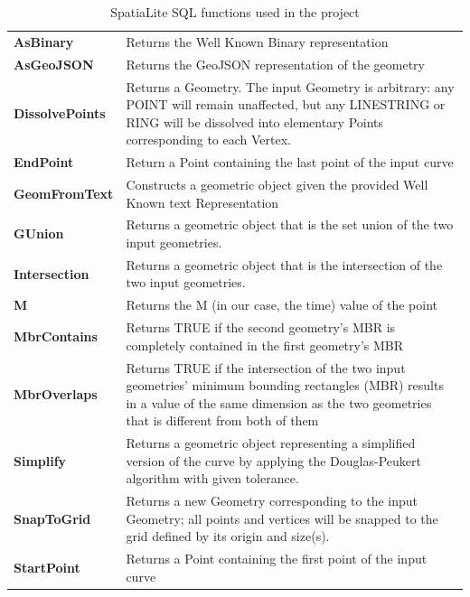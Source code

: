 \documentclass[12pt,a4paper]{article}
\begin{document}
                \begin{table}
                    \begin{tabular}{ | p{3.5cm} p{11.5cm} | }
                    \hline
                    \textbf{AsBinary} & Returns the Well Known Binary representation \\[4pt]
                    \textbf{AsGeoJSON} & Returns the GeoJSON representation of the geometry \\[4pt]
                    \textbf{DissolvePoints} & Returns a Geometry. The input Geometry is arbitrary: any POINT will remain unaffected, but any LINESTRING or RING will be dissolved into elementary Points corresponding to each Vertex.\\ [4pt]
                    \textbf{EndPoint} & Return a Point containing the last point of the input curve \\[4pt]
                    \textbf{GeomFromText} & Constructs a geometric object given the provided Well Known text Representation \\[4pt]
                    \textbf{GUnion} & Returns a geometric object that is the set union of the two input geometries. \\[4pt]
                    \textbf{Intersection} & Returns a geometric object that is the intersection of the two input geometries. \\[4pt]
                    \textbf{M} & Returns the M (in our case, the time) value of the point \\ [4pt]
                    \textbf{MbrContains} & Returns TRUE if the second geometry's MBR is completely contained in the first geometry's MBR \\[4pt]
                    \textbf{MbrOverlaps} & Returns TRUE if the intersection of the two input geometries' minimum bounding rectangles (MBR) results in a value of the same dimension as the two geometries that is different from both of them \\[4pt]
                    \textbf{Simplify} & Returns a geometric object representing a simplified version of the curve by applying the Douglas-Peukert algorithm with given tolerance. \\[4pt]
                    \textbf{SnapToGrid} & Returns a new Geometry corresponding to the input Geometry; all points and vertices will be snapped to the grid defined by its origin and size(s). \\[4pt]
                    \textbf{StartPoint} & Returns a Point containing the first point of the input curve \\[4pt]
                    \hline
                    \end{tabular}
                    \caption{SpatiaLite SQL functions used in the project}
                    \label{table:functions}
                \end{table}
                
\end{document}
